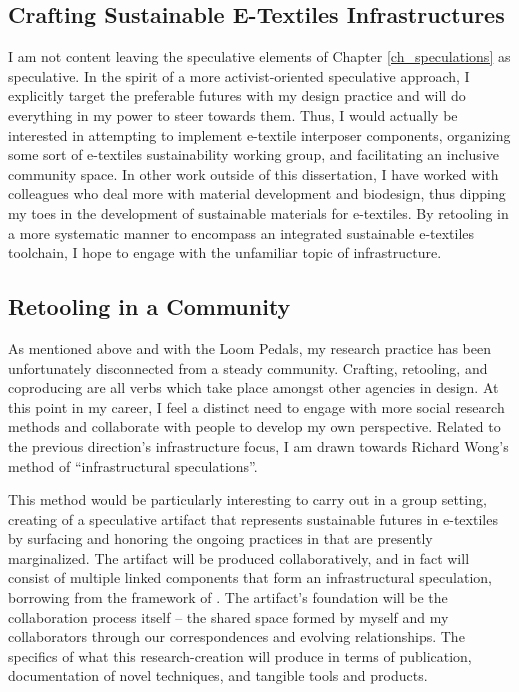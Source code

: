 \subsection{Crafting Sustainable E-Textiles Infrastructures}

I am not content leaving the speculative elements of Chapter \ref{ch_speculations} as speculative. In the spirit of a more activist-oriented speculative approach, I explicitly target the preferable futures with my design practice and will do everything in my power to steer towards them. Thus, I would actually be interested in attempting to implement e-textile interposer components, organizing some sort of e-textiles sustainability working group, and facilitating an inclusive community space. In other work outside of this dissertation, I have worked with colleagues who deal more with material development and biodesign, thus dipping my toes in the development of sustainable materials for e-textiles. 
By retooling in a more systematic manner to encompass an integrated sustainable e-textiles toolchain, I hope to engage with the unfamiliar topic of infrastructure.

\subsection{Retooling in a Community}

As mentioned above and with the Loom Pedals, my research practice has been unfortunately disconnected from a steady community. Crafting, retooling, and coproducing are all verbs which take place amongst other agencies in design. At this point in my career, I feel a distinct need to engage with more social research methods and collaborate with people to develop my own perspective. Related to the previous direction's infrastructure focus, I am drawn towards Richard Wong's method of ``infrastructural speculations''. 

This method would be particularly interesting to carry out in a group setting, creating of a speculative artifact that represents sustainable futures in e-textiles by surfacing and honoring the ongoing practices in  that are presently marginalized. The artifact will be produced collaboratively, and in fact will consist of multiple linked components that form an infrastructural speculation, borrowing from the framework of \cite{wong_infrastructural_2020}. The artifact's foundation will be the collaboration process itself -- the shared space formed by myself and my collaborators through our correspondences and evolving relationships. The specifics of what this research-creation will produce in terms of publication, documentation of novel techniques, and tangible tools and products.

